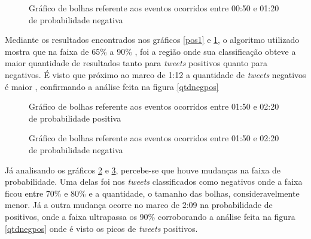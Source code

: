 \begin{figure}[H]
	\centering{}
	\caption{Gráfico de bolhas referente aos eventos ocorridos entre 00:50 e 01:20 de probabilidade negativa}
	\label{neg1}
\end{figure}

Mediante os resultados encontrados nos gráficos \ref{pos1} e \ref{neg1}, o algoritmo utilizado mostra que na faixa de 65\% a 90\% , foi a região onde sua classificação obteve a maior quantidade de resultados tanto para \textit{tweets} positivos quanto para negativos. É visto que próximo ao marco de 1:12 a quantidade de \textit{tweets} negativos é maior , confirmando a análise feita na figura \ref{qtdnegpos}


\begin{figure}[H]
	\centering{}
	\caption{Gráfico de bolhas referente aos eventos ocorridos entre 01:50 e 02:20 de probabilidade positiva}
	\label{pos2}
\end{figure}

\begin{figure}[H]
	\centering{}
	\caption{Gráfico de bolhas referente aos eventos ocorridos entre 01:50 e 02:20 de probabilidade negativa}
	\label{neg2}
\end{figure}

Já analisando os gráficos \ref{pos2} e \ref{neg2}, percebe-se que houve mudanças na faixa de probabilidade. Uma delas foi nos \textit{tweets} classificados como negativos onde a faixa ficou entre 70\% e 80\%  e a quantidade, o tamanho das bolhas, consideravelmente menor. Já a outra mudança ocorre no marco de 2:09 na probabilidade de positivos, onde a faixa ultrapassa os 90\% corroborando a análise feita na figura \ref{qtdnegpos} onde é visto os picos de \textit{tweets} positivos.  
